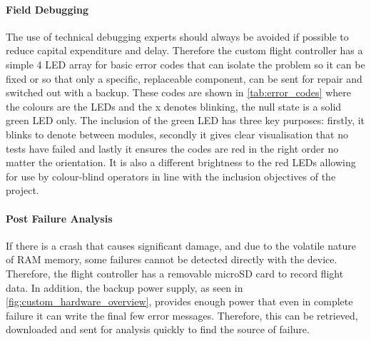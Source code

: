 \paragraph{Field Debugging}
The use of technical debugging experts should always be avoided if possible to reduce capital expenditure and delay. Therefore the custom flight controller has a simple 4 \gls{LED} array for basic error codes that can isolate the problem so it can be fixed or so that only a specific, replaceable component, can be sent for repair and switched out with a backup. These codes are shown in \ref{tab:error_codes} where the colours are the \gls{LED}s and the x denotes blinking, the null state is a solid green \gls{LED} only.  The inclusion of the green LED has three key purposes: firstly, it blinks to denote between modules, secondly it gives clear visualisation that no tests have failed and lastly it ensures the codes are red in the right order no matter the orientation. It is also a different brightness to the red \gls{LED}s allowing for use by colour-blind operators in line with the inclusion objectives of the project.

\paragraph{Post Failure Analysis}
If there is a crash that causes significant damage, and due to the volatile nature of \gls{RAM} memory, some failures cannot be detected directly with the device. Therefore, the flight controller has a removable microSD card to record flight data. In addition, the backup power supply, as seen in \ref{fig:custom_hardware_overview}, provides enough power that even in complete failure it can write the final few error messages. Therefore, this can be retrieved, downloaded and sent for analysis quickly to find the source of failure.